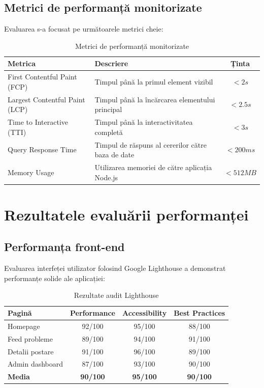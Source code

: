 \documentclass[12pt,a4paper]{report}
\begin{document}
\subsection{Metrici de performanță monitorizate}

Evaluarea s-a focusat pe următoarele metrici cheie:

\begin{table}[H]
\centering
\caption{Metrici de performanță monitorizate}
\label{tab:performance_metrics}
\begin{tabular}{|l|p{7cm}|c|}
\hline
\textbf{Metrica} & \textbf{Descriere} & \textbf{Ținta} \\
\hline
First Contentful Paint (FCP) & Timpul până la primul element vizibil & $< 2s$ \\
\hline
Largest Contentful Paint (LCP) & Timpul până la încărcarea elementului principal & $< 2.5s$ \\
\hline
Time to Interactive (TTI) & Timpul până la interactivitatea completă & $< 3s$ \\
\hline
Query Response Time & Timpul de răspuns al cererilor către baza de date & $< 200ms$ \\
\hline
Memory Usage & Utilizarea memoriei de către aplicația Node.js & $< 512MB$ \\
\hline
\end{tabular}
\end{table}

\section{Rezultatele evaluării performanței}

\subsection{Performanța front-end}

Evaluarea interfeței utilizator folosind Google Lighthouse a demonstrat performanțe solide ale aplicației:

\begin{table}[H]
\centering
\caption{Rezultate audit Lighthouse}
\label{tab:lighthouse_results}
\begin{tabular}{|l|c|c|c|}
\hline
\textbf{Pagină} & \textbf{Performance} & \textbf{Accessibility} & \textbf{Best Practices} \\
\hline
Homepage & 92/100 & 95/100 & 88/100 \\
\hline
Feed probleme & 89/100 & 94/100 & 91/100 \\
\hline
Detalii postare & 91/100 & 96/100 & 89/100 \\
\hline
Admin dashboard & 87/100 & 93/100 & 90/100 \\
\hline
\textbf{Media} & \textbf{90/100} & \textbf{95/100} & \textbf{90/100} \\
\hline
\end{tabular}
\end{table}
\end{document}
